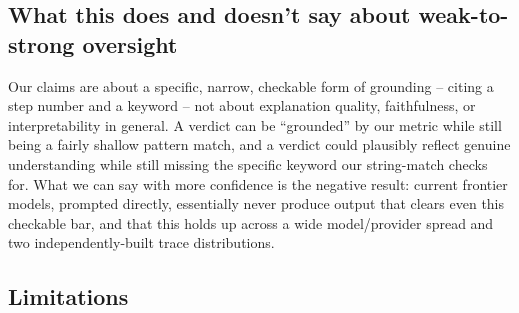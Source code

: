 \documentclass[conference]{IEEEtran}
\begin{document}
\subsection{What this does and doesn't say about weak-to-strong oversight}

Our claims are about a specific, narrow, checkable form of grounding --
citing a step number and a keyword -- not about explanation quality,
faithfulness, or interpretability in general. A verdict can be ``grounded''
by our metric while still being a fairly shallow pattern match, and a
verdict could plausibly reflect genuine understanding while still missing
the specific keyword our string-match checks for. What we can say with more
confidence is the negative result: current frontier models, prompted
directly, essentially never produce output that clears even this checkable
bar, and that this holds up across a wide model/provider spread and two
independently-built trace distributions.

\subsection{Limitations}
\end{document}
